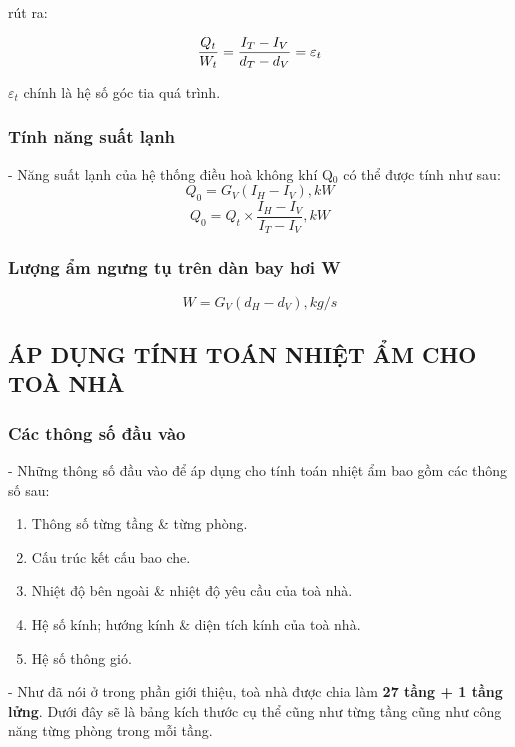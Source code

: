 rút ra:

\begin{equation}
	 \dfrac{Q_{t}}{W_{t}}  =  \dfrac{I_{T} - I_{V}}{d_{T} - d_{V}}  = {\LARGE \varepsilon_{t}}
\end{equation}

{\Large $\varepsilon_{t}$} chính là hệ số góc tia quá trình.

\subsubsection{Tính năng suất lạnh}
- Năng suất lạnh của hệ thống điều hoà không khí Q$ _{0} $ có thể được tính như sau:
\begin{equation}
	Q _{0} = G_{V}(I_{H} - I_{V}), \textit{kW}
\end{equation}
\begin{equation}
	 Q _{0} = Q_{t}\times\dfrac{I_{H} - I_{V}}{I_{T} - I_{V}}, \textit{kW}
\end{equation}


\subsubsection{Lượng ẩm ngưng tụ trên dàn bay hơi W}
\begin{equation}
	W = G_{V}(d_{H}-d_{V}), \textit{kg/s}
\end{equation}

\subsection{ÁP DỤNG TÍNH TOÁN NHIỆT ẨM CHO TOÀ NHÀ}
\subsubsection{Các thông số đầu vào}
- Những thông số đầu vào để áp dụng cho tính toán nhiệt ẩm bao gồm các thông số sau:

\begin{enumerate}[leftmargin=2.2cm]
	\item Thông số từng tầng \& từng phòng.
	\item Cấu trúc kết cấu bao che.
	\item Nhiệt độ bên ngoài \& nhiệt độ yêu cầu của toà nhà.
	\item Hệ số kính; hướng kính \& diện tích kính của toà nhà.
	\item Hệ số thông gió.
\end{enumerate}

- Như đã nói ở trong phần giới thiệu, toà nhà được chia làm \textbf{27 tầng + 1 tầng lửng}. Dưới đây sẽ là bảng kích thước cụ thể cũng như từng tầng cũng như công năng từng phòng trong mỗi tầng.

